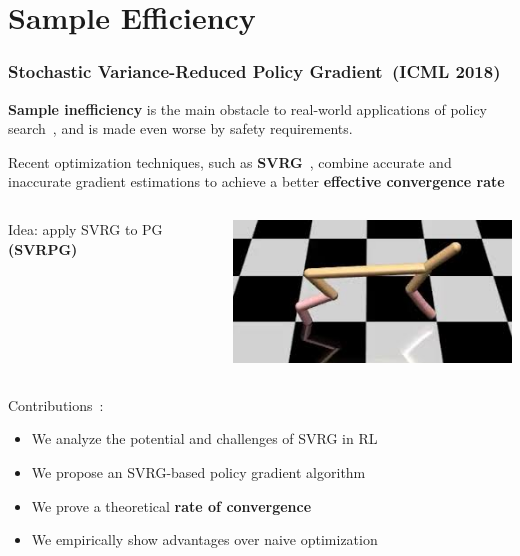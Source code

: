 \documentclass{beamer}
\begin{document}
\section{Sample Efficiency}


\begin{frame}
\frametitle{Stochastic Variance-Reduced Policy Gradient~\small(ICML 2018)}
\textbf{Sample inefficiency} is the main obstacle to real-world applications of policy search~\cite{recht2018tour}, and is made even worse by safety requirements.

\vfill

Recent optimization techniques, such as \textbf{SVRG}~\cite{johnson2013accelerating}, combine accurate and inaccurate gradient estimations to achieve a better \textbf{effective convergence rate}

\vfill

\begin{columns}
	\begin{column}{0.59\textwidth}
		Idea: apply SVRG to PG \textbf{(SVRPG)}
	\end{column}
	\begin{column}{0.29\textwidth}
		\includegraphics[width=\textwidth]{pics/cheetah.jpeg}
	\end{column}
\end{columns}

\vfill

Contributions~\cite{papini2018stochastic}:
\begin{itemize}
	\item We analyze the potential and challenges of SVRG in RL
	\item We propose an SVRG-based policy gradient algorithm
	\item We prove a theoretical \textbf{rate of convergence}
	\item We empirically show advantages over naive optimization
\end{itemize}

\end{frame}
\end{document}
